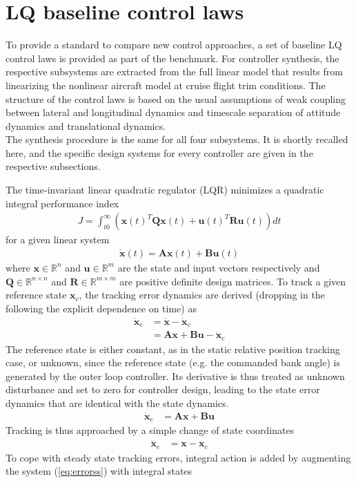 \documentclass{ifacconf}
\newcommand{\mbf}[1]{\mathbf{#1}}
\providecommand{\mbf}[1]{\mathbf{#1}}
\begin{document}
\section{LQ baseline control laws}
\label{sec:lqr}
To provide a standard to compare new control approaches, a set of baseline LQ control laws is provided as part of the benchmark. For controller synthesis, the respective subsystems are extracted from the full linear model that results from linearizing the nonlinear aircraft model at cruise flight trim conditions. The structure of the control laws is based on the usual assumptions of weak coupling between lateral and longitudinal dynamics and timescale separation of attitude dynamics and translational dynamics.\\
The synthesis procedure is the same for all four subsystems. It is shortly recalled here, and the specific design systems for every controller are given in the respective subsections. 

\noindent
The time-invariant linear quadratic regulator (LQR) minimizes a quadratic integral performance index
\begin{align}
J = \int_{t0}^{\infty}(
\mathbf{x}(t)^T 
\mathbf{Q}
\mathbf{x}(t)
+
\mathbf{u}(t)^T 
\mathbf{R}
\mathbf{u}(t)
)
dt
\end{align}
for a given linear system
\begin{align}
\dot{\mathbf{x}}(t)
=
\mathbf{A}
\mathbf{x}(t)
+
\mathbf{B}
\mathbf{u}(t)
\end{align}
where $\mathbf{x} \in \mathbb{R}^n$ and $\mathbf{u} \in \mathbb{R}^m$ are the state and input vectors respectively and $\mathbf{Q} \in \mathbb{R}^{n\times n}$ and $\mathbf{R} \in \mathbb{R}^{m\times m}$ are positive definite design matrices.
To track a given reference state $\mbf{x}_c$, the tracking error dynamics are derived (dropping in the following the explicit dependence on time) as
\begin{align}
\dot{\mathbf{x}}_e
&=
\dot{\mbf{x}}
-
\dot{\mathbf{x}}_c \\
{}
&=
\mathbf{A}
\mathbf{x}
+
\mathbf{B}
\mathbf{u}
-
\dot{\mathbf{x}}_c 
\end{align}
The reference state is either constant, as in the static relative position tracking case, or unknown, since the reference state (e.g. the commanded bank angle) is generated by the outer loop controller. Its derivative is thus treated as unknown disturbance and set to zero for controller design, leading to the state error dynamics
that are identical with the state dynamics. 
\begin{align}
\dot{\mathbf{x}}_e
&=
\mathbf{A}
\mathbf{x}
+
\mathbf{B}
\mbf{u}
\end{align}
Tracking is thus approached by a simple change of state coordinates
\begin{align}
\dot{\mbf{x}}_e
&=
{\mbf{x}}
-
{\mbf{x}}_c 
\label{eq:errorss}
\end{align}
To cope with steady state tracking errors, integral action is added by augmenting the system (\ref{eq:errorss}) with integral states
\end{document}
